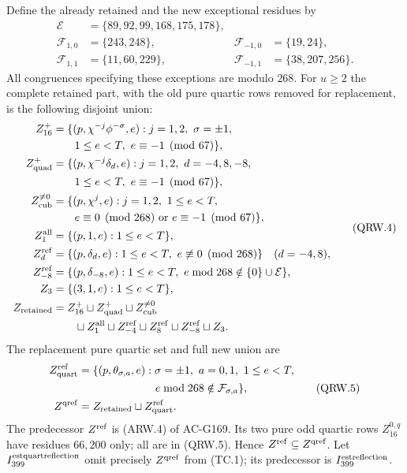 Define the already retained and the new exceptional residues by
\[
 \begin{aligned}
 \mathcal E&=\{89,92,99,168,175,178\},\\
 \mathcal F_{1,0}&=\{243,248\},&\mathcal F_{-1,0}&=\{19,24\},\\
 \mathcal F_{1,1}&=\{11,60,229\},&\mathcal F_{-1,1}&=\{38,207,256\}.
 \end{aligned}
 \tag{QRW.3}
\]
All congruences specifying these exceptions are modulo $268$.
For $u\geq2$ the complete retained part, with the old pure
quartic rows removed for replacement, is the following disjoint union:
\[
 \begin{aligned}
 Z_{16}^+&=\{(p,\chi^{-j}\phi^{-\sigma},e):j=1,2,\ \sigma=\pm1,\\
 &\hspace{2em}1\leq e<T,\ e\equiv-1\pmod{67}\},\\
 Z_{\rm quad}^+&=\{(p,\chi^{-j}\delta_d,e):j=1,2,\ d=-4,8,-8,\\
 &\hspace{2em}1\leq e<T,\ e\equiv-1\pmod{67}\},\\
 Z_{\rm cub}^{\ne0}&=\{(p,\chi^j,e):j=1,2,\ 1\leq e<T,\\
 &\hspace{2em}e\equiv0\pmod{268}\ \text{or}\ e\equiv-1\pmod{67}\},\\
 Z_1^{\rm all}&=\{(p,1,e):1\leq e<T\},\\
 Z_d^{\rm ref}&=\{(p,\delta_d,e):1\leq e<T,\ e\not\equiv0\pmod{268}\}
                                                \quad(d=-4,8),\\
 Z_{-8}^{\rm ref}&=\{(p,\delta_{-8},e):1\leq e<T,
                         \ e\bmod268\notin\{0\}\cup\mathcal E\},\\
 Z_3&=\{(3,1,e):1\leq e<T\},\\
 Z_{\rm retained}&=Z_{16}^+\sqcup Z_{\rm quad}^+
    \sqcup Z_{\rm cub}^{\ne0}\\
    &\hspace{2em}\sqcup Z_1^{\rm all}\sqcup Z_{-4}^{\rm ref}
       \sqcup Z_8^{\rm ref}\sqcup Z_{-8}^{\rm ref}\sqcup Z_3.
 \end{aligned}
 \tag{QRW.4}
\]
The replacement pure quartic set and full new union are
\[
 \begin{aligned}
 Z_{\rm quart}^{\rm ref}
   &=\{(p,\theta_{\sigma,a},e):\sigma=\pm1,\ a=0,1,\ 1\leq e<T,\\
   &\hspace{7em}e\bmod268\notin\mathcal F_{\sigma,a}\},\\
 Z^{\rm qref}&=Z_{\rm retained}\sqcup Z_{\rm quart}^{\rm ref}.
 \end{aligned}
 \tag{QRW.5}
\]
The predecessor $Z^{\rm ref}$ is (ARW.4) of AC-G169.
Its two pure odd quartic rows $Z_{16}^{0,q}$ have residues
$66,200$ only; all are in (QRW.5).
Hence $Z^{\rm ref}\subseteq Z^{\rm qref}$.
Let $I_{399}^{\rm estquartreflection}$ omit precisely $Z^{\rm qref}$
from (TC.1); its predecessor is $I_{399}^{\rm estreflection}$.

